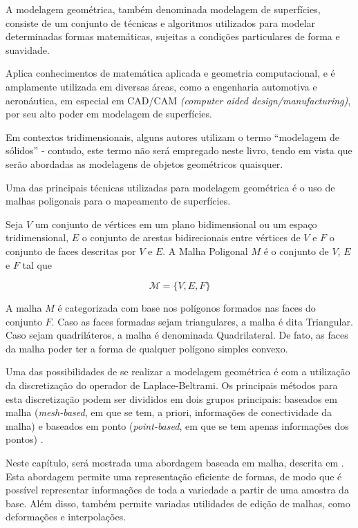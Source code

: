 A modelagem geométrica, também denominada modelagem de superfícies, consiste de um conjunto de técnicas e algoritmos utilizados para modelar determinadas formas matemáticas, sujeitas a condições particulares de forma e suavidade.

Aplica conhecimentos de matemática aplicada e geometria computacional, e é amplamente utilizada em diversas áreas, como a engenharia automotiva e aeronáutica, em especial em CAD/CAM \textit{(computer aided design/manufacturing)}, por seu alto poder em modelagem de superfícies.

Em contextos tridimensionais, alguns autores utilizam o termo ``modelagem de sólidos'' \cite{agoston2005} - contudo, este termo não será empregado neste livro, tendo em vista que serão abordadas as modelagens de objetos geométricos quaisquer.  

Uma das principais técnicas utilizadas para modelagem geométrica é o uso de malhas poligonais para o mapeamento de superfícies.

\begin{defi}
Seja $V$ um conjunto de vértices em um plano bidimensional ou um espaço tridimensional, $E$ o conjunto de arestas bidirecionais entre vértices de $V$ e $F$ o conjunto de faces descritas por $V$ e $E$. A Malha Poligonal $M$ é o conjunto de $V$, $E$ e $F$ tal que

\begin{equation}
    \mathbf{\mathcal{M}} = \{V, E, F\}
\end{equation}

A malha $M$ é categorizada com base nos polígonos formados nas faces do conjunto $F$. Caso as faces formadas sejam triangulares, a malha é dita Triangular. Caso sejam quadriláteros, a malha é denominada Quadrilateral. De fato, as faces da malha poder ter a forma de qualquer polígono simples convexo.
\end{defi}

Uma das possibilidades de se realizar a modelagem geométrica é com a utilização da discretização do operador de Laplace-Beltrami. Os principais métodos para esta discretização podem ser divididos em dois grupos principais: baseados em malha (\textit{mesh-based}, em que se tem, a priori, informações de conectividade da malha) e baseados em ponto (\textit{point-based}, em que se tem apenas informações dos pontos) \cite{petronetto2013}.

Neste capítulo, será mostrada uma abordagem baseada em malha, descrita em \cite{sorkine2006}. Esta abordagem permite uma representação eficiente de formas, de modo que é possível representar informações de toda a variedade a partir de uma amostra da base. Além disso, também permite variadas utilidades de edição de malhas, como deformações e interpolações.
